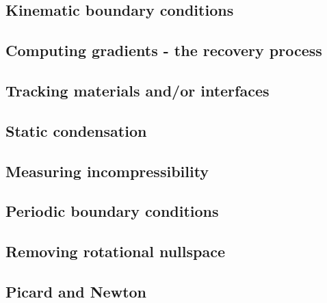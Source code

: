 \documentclass[a4paper]{article}
\begin{document}
\subsection{Kinematic boundary conditions}\label{kin_bc}  %
\newpage %
\subsection{Computing gradients - the recovery process}  %
\newpage %
\subsection{Tracking materials and/or interfaces}  %
\newpage %
\subsection{Static condensation}  %
\newpage %
\subsection{Measuring incompressibility \label{ss_incomp}}  %
\newpage %
\subsection{Periodic boundary conditions\label{ss_periodic}} %
\newpage %
\subsection{Removing rotational nullspace\label{ss_nullspace}}  %
\newpage %
\subsection{Picard and Newton \label{ss_nonlinear}}  %
\newpage %
\end{document}
